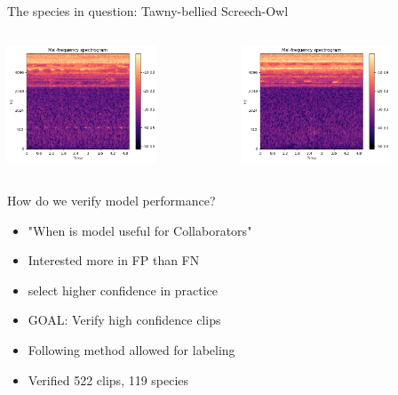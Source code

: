 \begin{frame}{The species in question: Tawny-bellied Screech-Owl}
    \begin{columns}
        \begin{column}{0.5\textwidth}
            \includegraphics[height=1\textheight,width=0.7\textwidth,keepaspectratio]{./images/image (6).png}
        \end{column}
        \begin{column}{0.5\textwidth}
            \includegraphics[height=1\textheight,width=0.7\textwidth,keepaspectratio]{./images/image (7).png}
        \end{column}
    \end{columns}
\end{frame}


\begin{frame}{How do we verify model performance?}
    \begin{itemize}
        \item "When is model useful for Collaborators"
        \item Interested more in FP than FN
        \item select higher confidence in practice
        \item GOAL: Verify high confidence clips
        \item Following method allowed for labeling
        \item Verified 522 clips, 119 species
    \end{itemize}
\end{frame}

